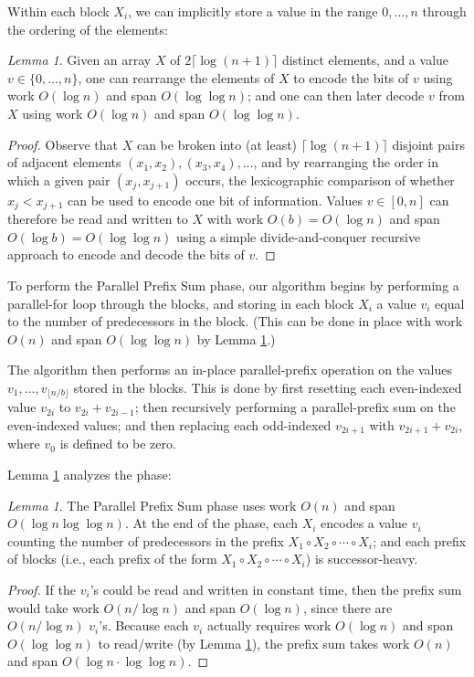 \documentclass[sigplan, 10pt, nonacm]{acmart}
\theoremstyle{remark}
\newtheorem{lemma}[thm]{Lemma}
\theoremstyle{remark}
\begin{document}
\begin{appendices}
Within each block $X_i$, we can implicitly store a value in the range
$0, \ldots, n$ through the ordering of the elements:
\begin{lemma}
Given an array $X$ of $2 \lceil \log (n + 1) \rceil$ distinct
elements, and a value $v \in \{0, \ldots, n\}$, one can rearrange the
elements of $X$ to encode the bits of $v$ using work $O(\log n)$ and
span $O(\log \log n)$; and one can then later decode $v$ from $X$
using work $O(\log n)$ and span $O(\log \log n)$.
\label{lem:bitstore}
\end{lemma}
\begin{proof}
Observe that $X$ can be broken into (at least) $\lceil \log (n + 1)
\rceil$ disjoint pairs of adjacent elements $(x_1, x_2), (x_3, x_4),
\ldots$, and by rearranging the order in which a given pair $(x_j,
x_{j + 1})$ occurs, the lexicographic comparison of whether $x_j <
x_{j + 1}$ can be used to encode one bit of information. Values $v \in
[0,n]$ can therefore be read and written to $X$ with work $O(b) =
O(\log n)$ and span $O(\log b) = O(\log \log n)$ using a simple
divide-and-conquer recursive approach to encode and decode the bits of
$v$.
\end{proof}

To perform the Parallel Prefix Sum phase, our algorithm begins by
performing a parallel-for loop through the blocks, and storing in each
block $X_i$ a value $v_i$ equal to the number of predecessors in the
block. (This can be done in place with work $O(n)$ and span $O(\log
\log n)$ by Lemma \ref{lem:bitstore}.)

The algorithm then performs an in-place parallel-prefix operation on
the values $v_1, \ldots, v_{\lfloor n / b \rfloor}$ stored in the
blocks. This is done by first resetting each even-indexed value
$v_{2i}$ to $v_{2i} + v_{2i - 1}$; then recursively performing a
parallel-prefix sum on the even-indexed values; and then replacing
each odd-indexed $v_{2i + 1}$ with $v_{2i + 1} + v_{2i}$, where $v_0$
is defined to be zero.

Lemma \ref{lem:parallelprefix} analyzes the phase:
\begin{lemma}
  The Parallel Prefix Sum phase uses work $O(n)$ and span
  $O(\log n \log \log n)$. At the end of the phase, each $X_i$ encodes
  a value $v_i$ counting the number of predecessors in the prefix
  $X_1 \circ X_2 \circ \cdots \circ X_i$; and each prefix of blocks
  (i.e., each prefix of the form
  $X_1 \circ X_2 \circ \cdots \circ X_i$) is successor-heavy.
\label{lem:parallelprefix}
\end{lemma}
\begin{proof}
If the $v_i$'s could be read and written in constant time, then the
prefix sum would take work $O(n / \log n)$ and span $O(\log n)$, since
there are $O(n / \log n)$ $v_i$'s. Because each $v_i$ actually
requires work $O(\log n)$ and span $O(\log \log n)$ to read/write (by
Lemma \ref{lem:bitstore}), the prefix sum takes work $O(n)$ and span
$O(\log n \cdot \log \log n)$.


\end{proof}
\end{appendices}
\end{document}
